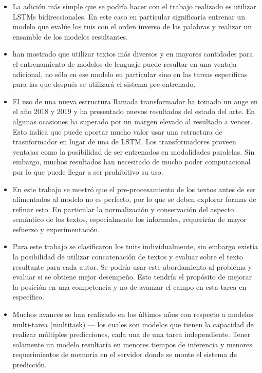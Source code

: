 \begin{itemize}

\item La adición más simple que se podría hacer con el trabajo realizado es utilizar LSTMs bidireccionales. En este caso en particular significaría entrenar un modelo que evalúe los tuis con el orden inverso de las palabras y realizar un ensamble de los modelos resultantes.

\item \textcite{radford2019language} han mostrado que utilizar textos más diversos y en mayores cantidades para el entrenamiento de modelos de lenguaje puede resultar en una ventaja adicional, no sólo en ese modelo en particular sino en las tareas específicas para las que después se utilizará el sistema pre-entrenado.

\item El uso de una nueva estructura llamada transformador ha tomado un auge en el año 2018 y 2019 y ha presentado nuevos resultados del estado del arte. En algunas ocasiones ha superado por un margen elevado al resultado a vencer. Esto indica que puede aportar mucho valor usar una estructura de trasnformador en lugar de una de LSTM. Los transformadores proveen ventajas como la posibilidad de ser entrenados en modalidades paralelas. Sin embargo, muchos resultados han necesitado de mucho poder computacional por lo que puede llegar a ser prohibitivo su uso.

\item En este trabajo se mostró que el pre-procesamiento de los textos antes de ser alimentados al modelo no es perfecto, por lo que se deben explorar formas de refinar esto. En particular la normalización y conservación del aspecto semántico de los textos, especialmente los informales, requerirán de mayor esfuerzo y experimentación.

\item Para este trabajo se clasificaron los tuits individualmente, sin embargo existía la posibilidad de utilizar concatenación de textos y evaluar sobre el texto resultante para cada autor. Se podría usar este abordamiento al problema y evaluar si se obtiene mejor desempeño. Esto tendría el propósito de mejorar la posición en una competencia y no de avanzar el campo en esta tarea en específico.

\item Muchos avances se han realizado en los últimos años con respecto a modelos multi-tarea (multitask) --- los cuales son modelos que tienen la capacidad de realizar múltiples predicciones, cada una de una tarea independiente. Tener solamente un modelo resultaría en menores tiempos de inferencia y menores requerimientos de memoria en el servidor donde se monte el sistema de predicción.


\end{itemize}

